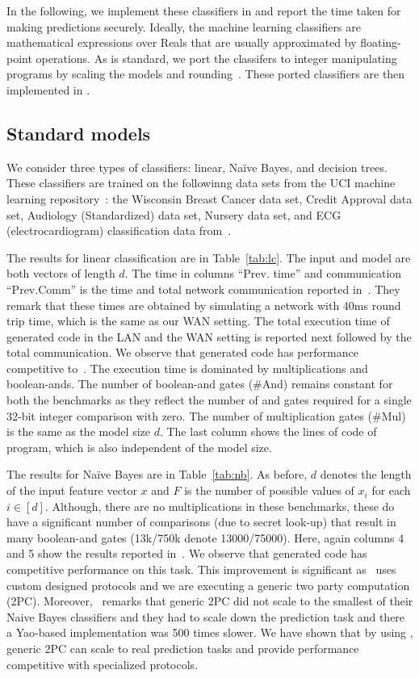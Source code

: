 In the following, we implement these classifiers in \tool and report the time taken for making predictions securely. Ideally, the machine learning classifiers are mathematical expressions over Reals that are usually approximated by floating-point operations.
As is standard, we port the classifers to integer manipulating programs by scaling the models and rounding~\cite{minionn}. These ported classifiers are then implemented in \tool.

\subsection{Standard models}
\label{sec:shallow}
We consider three types of classifiers: linear, Na\"{i}ve Bayes, and decision trees. 
These classifiers are trained on the followinng data sets from the UCI  machine learning repository~\cite{uci}:
 the Wisconsin Breast Cancer data set, 
Credit Approval data set, Audiology (Standardized) data set, Nursery data set, and
ECG (electrocardiogram) classification data from~\cite{barni}.

The results for linear classification are in Table~\ref{tab:lc}. The input and model are both vectors of length $d$. The time in columns ``Prev. time'' and communication ``Prev.Comm'' is the time and total network communication reported in~\cite{shafindss}. They remark that these times are obtained by simulating a network with 40ms round trip time, which is the same as our WAN setting. The total execution time of \tool generated code in the LAN and the WAN setting is reported next followed by the total communication.
We observe that \tool generated code has performance competitive to~\cite{shafindss}.
The execution time is dominated by multiplications and boolean-ands.
The number of boolean-and gates (\#And) remains constant for both the benchmarks as they reflect the number of and gates required for a single 32-bit integer comparison with zero. The number of multiplication gates (\#Mul) is the same as the model size $d$. The last column shows the lines of code of \tool program, which is also independent of the model size.

The results for Na\"{i}ve Bayes are in Table~\ref{tab:nb}. As before, $d$ denotes the length of the input feature vector $x$ and $F$ is the number of possible values of $x_i$ for each $i \in [d]$.
Although, there are no multiplications in these benchmarks, these do have a significant number of comparisons (due to secret look-up) that result in many boolean-and gates (13k/750k denote 13000/75000). 
Here, again columns 4 and 5 show the results reported in~\cite{shafindss}. We observe that \tool generated code has competitive performance on this task. This improvement is significant as~\cite{shafindss} uses custom designed protocols and we are executing a generic two party computation (2PC). Moreover,~\cite{shafindss} remarks that generic 2PC did not scale to the smallest of their Naive Bayes classifiers and they had to scale down the prediction task and there a Yao-based implementation was 500 times slower. We have shown that by using \tool, generic 2PC can scale to real prediction tasks and provide performance competitive with specialized protocols. 

